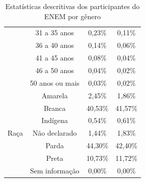 \begin{table}[h]
\begin{tabular}{cccc}
                                                & 31 a 35 anos              & 0,23\%            & 0,11\%             \\ \cline{2-4} 
                                                & 36 a 40 anos              & 0,14\%            & 0,06\%             \\ \cline{2-4} 
                                                & 41 a 45 anos              & 0,08\%            & 0,04\%             \\ \cline{2-4} 
                                                & 46 a 50 anos              & 0,04\%            & 0,02\%             \\ \cline{2-4} 
                                                & 50 anos ou mais           & 0,03\%            & 0,02\%             \\ \hline
    \multirow{7}{*}{Raça}                       & Amarela                   & 2,45\%            & 1,86\%             \\ \cline{2-4} 
                                                & Branca                    & 40,53\%           & 41,57\%            \\ \cline{2-4} 
                                                & Indígena                  & 0,54\%            & 0,61\%             \\ \cline{2-4} 
                                                & Não declarado             & 1,44\%            & 1,83\%             \\ \cline{2-4} 
                                                & Parda                     & 44,30\%           & 42,40\%            \\ \cline{2-4} 
                                                & Preta                     & 10,73\%           & 11,72\%            \\ \cline{2-4} 
                                                & Sem informação            & 0,00\%            & 0,00\%             \\ \hline
    \end{tabular}
    \caption{Estatísticas descritivas dos participantes do ENEM por gênero}
    \label{tab:estatistica-enem}
    \end{table}


